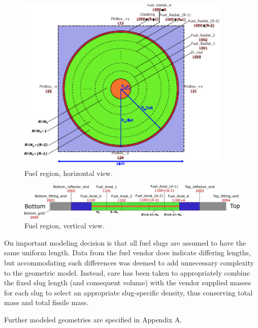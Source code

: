 \documentclass{UWNR_modeling}
\begin{document}
\begin{figure}[H]
  \centering
  \includegraphics[width=4in]{fuel_xy.pdf}
  \caption{Fuel region, horizontal view.}
  \label{fig:fuel_xy}
\end{figure}

\begin{figure}[H]
  \centering
  \includegraphics[width=7in]{fuel_yz.pdf}
  \caption{Fuel region, vertical view.}
  \label{fig:fuel_yz}
\end{figure}

On important modeling decision is that all fuel slugs are assumed to have the
same uniform length.  Data from the fuel vendor does indicate differing
lengths, but accommodating such differences was deemed to add unnecessary
complexity to the geometric model.  Instead, care has been taken to
appropriately combine the fixed slug length (and consequent volume) with the
vendor supplied masses for each slug to select an appropriate slug-specific
density, thus conserving total mass and total fissile mass.

Further modeled geometries are specified in Appendix A.
\newpage
\end{document}
